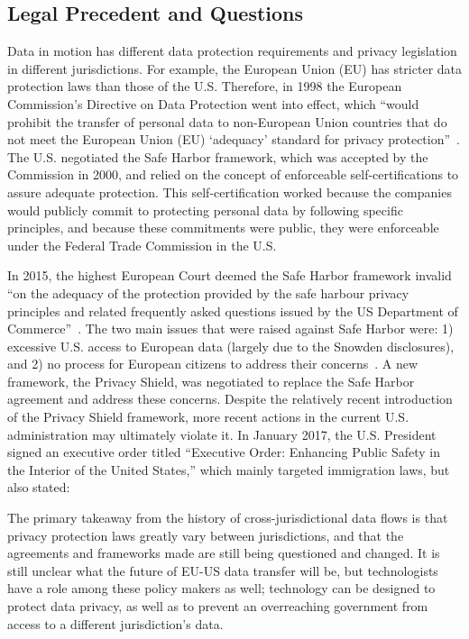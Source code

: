 \subsection{Legal Precedent and Questions}
Data in motion has different data protection requirements and privacy legislation in different jurisdictions.  For example, the European Union (EU) has stricter data protection laws than those of the U.S.  Therefore, in 1998 the European Commission's Directive on Data Protection went into effect, which ``would prohibit the transfer of personal data to non-European Union countries that do not meet the European Union (EU) `adequacy' standard for privacy protection''~\cite{safeharbor}.  The U.S. negotiated the Safe Harbor framework, which was accepted by the Commission in 2000, and relied on the concept of enforceable self-certifications to assure adequate protection.  This self-certification worked because the companies would publicly commit to protecting personal data by following specific principles, and because these commitments were public, they were enforceable under the Federal Trade Commission in the U.S.  

In 2015, the highest European Court deemed the Safe Harbor framework invalid ``on the adequacy of the protection provided by the safe harbour privacy principles and related frequently asked questions issued by the US Department of Commerce''~\cite{safeharbor}.  The two main issues that were raised against Safe Harbor were: 1) excessive U.S. access to European data (largely due to the Snowden disclosures), and 2) no process for European citizens to address their concerns~\cite{safeharbor_ps_diffs}.  A new framework, the Privacy Shield, was negotiated to replace the Safe Harbor agreement and address these concerns.  Despite the relatively recent introduction of the Privacy Shield framework, more recent actions in the current U.S. administration may ultimately violate it.  In January 2017, the U.S. President signed an executive order titled ``Executive Order: Enhancing Public Safety in the Interior of the United States,'' which mainly targeted immigration laws, but also stated:


The primary takeaway from the history of cross-jurisdictional data flows is that privacy protection laws greatly vary between jurisdictions, and that the agreements and frameworks made are still being questioned and changed.  It is still unclear what the future of EU-US data transfer will be, but technologists have a role among these policy makers as well; technology can be designed to protect data privacy, as well as to prevent an overreaching government from access to a different jurisdiction's data.

